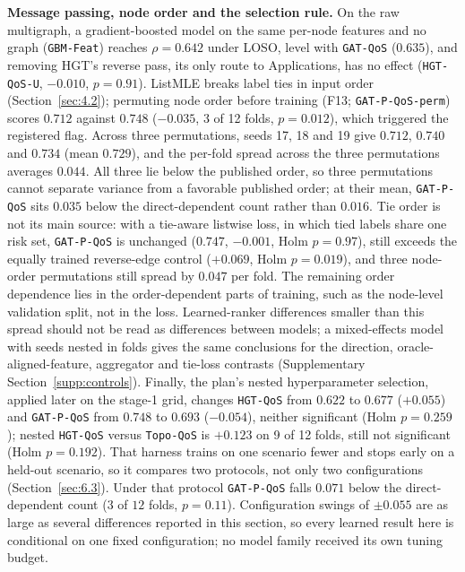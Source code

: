 \noindent\textbf{Message passing, node order and the selection rule.} On the raw multigraph, a gradient-boosted model on the same per-node features and no graph (\texttt{GBM-Feat}) reaches $\rho = 0.642$ under LOSO, level with \texttt{GAT-QoS} ($0.635$), and removing HGT's reverse pass, its only route to Applications, has no effect (\texttt{HGT-QoS-U}, $-0.010$, $p = 0.91$). ListMLE breaks label ties in input order (Section~\ref{sec:4.2}); permuting node order before training (F13; \texttt{GAT-P-QoS-perm}) scores $0.712$ against $0.748$ ($-0.035$, 3 of 12 folds, $p = 0.012$), which triggered the registered flag. Across three permutations, seeds 17, 18 and 19 give $0.712$, $0.740$ and $0.734$ (mean $0.729$), and the per-fold spread across the three permutations averages $0.044$. All three lie below the published order, so three permutations cannot separate variance from a favorable published order; at their mean, \texttt{GAT-P-QoS} sits $0.035$ below the direct-dependent count rather than $0.016$. Tie order is not its main source: with a tie-aware listwise loss, in which tied labels share one risk set, \texttt{GAT-P-QoS} is unchanged ($0.747$, $-0.001$, Holm $p = 0.97$), still exceeds the equally trained reverse-edge control ($+0.069$, Holm $p = 0.019$), and three node-order permutations still spread by $0.047$ per fold. The remaining order dependence lies in the order-dependent parts of training, such as the node-level validation split, not in the loss. Learned-ranker differences smaller than this spread should not be read as differences between models; a mixed-effects model with seeds nested in folds gives the same conclusions for the direction, oracle-aligned-feature, aggregator and tie-loss contrasts (Supplementary Section~\ref{supp:controls}). Finally, the plan's nested hyperparameter selection, applied later on the stage-1 grid, changes \texttt{HGT-QoS} from $0.622$ to $0.677$ ($+0.055$) and \texttt{GAT-P-QoS} from $0.748$ to $0.693$ ($-0.054$), neither significant (Holm $p = 0.259$); nested \texttt{HGT-QoS} versus \texttt{Topo-QoS} is $+0.123$ on 9 of 12 folds, still not significant (Holm $p = 0.192$). That harness trains on one scenario fewer and stops early on a held-out scenario, so it compares two protocols, not only two configurations (Section~\ref{sec:6.3}). Under that protocol \texttt{GAT-P-QoS} falls $0.071$ below the direct-dependent count ($3$ of $12$ folds, $p = 0.11$). Configuration swings of $\pm 0.055$ are as large as several differences reported in this section, so every learned result here is conditional on one fixed configuration; no model family received its own tuning budget.

